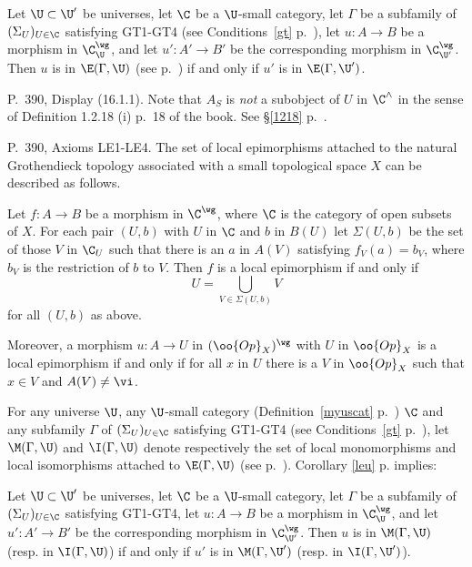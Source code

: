 \documentclass[12pt]{article}
\theoremstyle{remark}
\theoremstyle{definition}
\begin{document}
\begin{cor}
Let $\U\subset\U'$ be universes, let $\C$ be a $\U$-small category, let $\Gamma$ be a subfamily of $(\Sigma_U)_{U\in\C}$ satisfying GT1-GT4 (see Conditions~\ref{gt} p.~), let $u:A\to B$ be a morphism in $\C^\wg_\U$, and let $u':A'\to B'$ be the corresponding morphism in $\C^\wg_{\U'}$. Then $u$ is in $\E(\Gamma,\U)$ (see  p.~) if and only if $u'$ is in $\E(\Gamma,\U')$.
\end{cor}



\begin{s}
P.~390, Display (16.1.1). Note that $A_S$ is \emph{not} a subobject of $U$ in $\C^\wedge$ in the sense of Definition 1.2.18 (i) p.~18 of the book. See \S\ref{1218} p.~\pageref{1218}.
\end{s}

%

\begin{s}
P.~390, Axioms LE1-LE4. The set of local epimorphisms attached to the natural Grothendieck topology associated with a small topological space $X$ can be described as follows. 

Let $f:A\to B$ be a morphism in $\C^\wg$, where $\C$ is the category of open subsets of $X$. For each pair $(U,b)$ with $U$ in $\C$ and $b$ in $B(U)$ let $\Sigma(U,b)$ be the set of those $V$ in $\C_U$ such that there is an $a$ in $A(V)$ satisfying $f_V(a)=b_V$, where $b_V$ is the restriction of $b$ to $V$. Then $f$ is a local epimorphism if and only if 
$$
U=\bigcup_{V\in\Sigma(U,b)}V
$$ 
for all $(U,b)$ as above.

Moreover, a morphism $u:A\to U$ in $(\oo{Op}_X)^\wg$ with $U$ in $\oo{Op}_X$ is a local epimorphism if and only if for all $x$ in $U$ there is a $V$ in $\oo{Op}_X$ such that $x\in V$ and $A(V)\ne\vi$. 
\end{s}


\begin{s}
For any universe $\U$, any $\U$-small category (Definition~\ref{myuscat} p.~) $\C$ and any subfamily $\Gamma$ of $(\Sigma_U)_{U\in\C}$ satisfying GT1-GT4 (see Conditions~\ref{gt} p.~), let $\M(\Gamma,\U)$ and $\I(\Gamma,\U)$ denote respectively the set of local monomorphisms and local isomorphisms attached to $\E(\Gamma,\U)$ (see  p.~). Corollary \ref{leu} p.  implies:

Let $\U\subset\U'$ be universes, let $\C$ be a $\U$-small category, let $\Gamma$ be a subfamily of $(\Sigma_U)_{U\in\C}$ satisfying GT1-GT4, let $u:A\to B$ be a morphism in $\C^\wg_\U$, and let $u':A'\to B'$ be the corresponding morphism in $\C^\wg_{\U'}$. Then $u$ is in $\M(\Gamma,\U)$ (resp. in $\I(\Gamma,\U)$) if and only if $u'$ is in $\M(\Gamma,\U')$ (resp. in $\I(\Gamma,\U')$).
\end{s}
\end{document}
